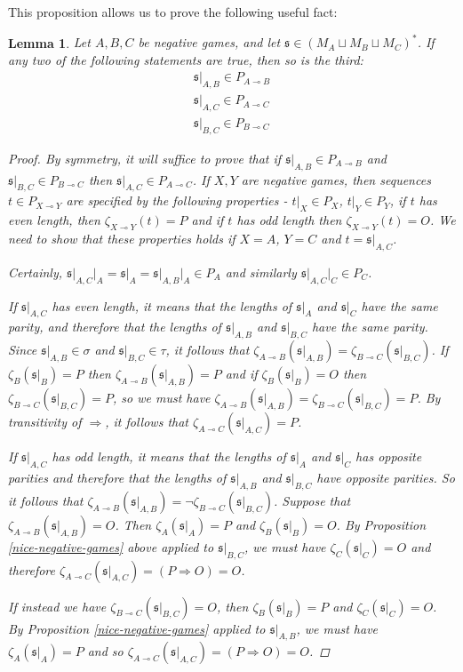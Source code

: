 \documentclass[11pt]{article} %
\theoremstyle{plain} %
\newtheorem{lemma}[theorem]{Lemma}
\theoremstyle{definition} %
\theoremstyle{note}
\theoremstyle{exercisestyle}
\renewcommand{\implies}{\multimap}
\newcommand{\cprd}{\sqcup}
\newcommand{\s}{\mathfrak s}
\begin{document}
This proposition allows us to prove the following useful fact:

\begin{lemma}
  \label{alternatingsequenceslemma}
  Let $A,B,C$ be negative games, and let $\s\in (M_A\cprd M_B\cprd M_C)^*$.  If any two of the following statements are true, then so is the third:
  \begin{gather*}
    \s\vert_{A,B}\in P_{A\implies B}\\
    \s\vert_{A,C}\in P_{A\implies C}\\
    \s\vert_{B,C}\in P_{B\implies C}
  \end{gather*}
  \begin{proof}
    By symmetry, it will suffice to prove that if $\s\vert_{A,B}\in P_{A\implies B}$ and $\s\vert_{B,C}\in P_{B\implies C}$ then $\s\vert_{A,C}\in P_{A\implies C}$.  If $X,Y$ are negative games, then sequences $t\in P_{X\implies Y}$ are specified by the following properties - $t\vert_X\in P_X$, $t\vert_Y\in P_Y$, if $t$ has even length, then $\zeta_{X\implies Y}(t)=P$ and if $t$ has odd length then $\zeta_{X\implies Y}(t)=O$.  We need to show that these properties holds if $X=A$, $Y=C$ and $t=\s\vert_{A,C}$.  

    Certainly, $\s\vert_{A,C}\vert_A=\s\vert_A=\s\vert_{A,B}\vert_A\in P_A$ and similarly $\s\vert_{A,C}\vert_C\in P_C$.  

    If $\s\vert_{A,C}$ has even length, it means that the lengths of $\s\vert_A$ and $\s\vert_C$ have the same parity, and therefore that the lengths of $\s\vert_{A,B}$ and $\s\vert_{B,C}$ have the same parity.  Since $\s\vert_{A,B}\in\sigma$ and $\s\vert_{B,C}\in\tau$, it follows that $\zeta_{A\implies B}(\s\vert_{A,B})=\zeta_{B\implies C}(\s\vert_{B,C})$.  If $\zeta_B(\s\vert_B)=P$ then $\zeta_{A\implies B}(\s\vert_{A,B})=P$ and if $\zeta_B(\s\vert_B)=O$ then $\zeta_{B\implies C}(\s\vert_{B,C})=P$, so we must have $\zeta_{A\implies B}(\s\vert_{A,B})=\zeta_{B\implies C}(\s\vert_{B,C})=P$.  By transitivity of $\Rightarrow$, it follows that $\zeta_{A\implies C}(\s\vert_{A,C})=P$.  

    If $\s\vert_{A,C}$ has odd length, it means that the lengths of $\s\vert_A$ and $\s\vert_C$ has opposite parities and therefore that the lengths of $\s\vert_{A,B}$ and $\s\vert_{B,C}$ have opposite parities.  So it follows that $\zeta_{A\implies B}(\s\vert_{A,B})=\neg\zeta_{B\implies C}(\s\vert_{B,C})$.  Suppose that $\zeta_{A\implies B}(\s\vert_{A,B})=O$.  Then $\zeta_A(\s\vert_A)=P$ and $\zeta_B(\s\vert_B)=O$.  By Proposition \ref{nice-negative-games} above applied to $\s\vert_{B,C}$, we must have $\zeta_C(\s\vert_C)=O$ and therefore $\zeta_{A\implies C}(\s\vert_{A,C})=(P\Rightarrow O)=O$.  

    If instead we have $\zeta_{B\implies C}(\s\vert_{B,C})=O$, then $\zeta_B(\s\vert_B)=P$ and $\zeta_C(\s\vert_C)=O$.  By Proposition \ref{nice-negative-games} applied to $\s\vert_{A,B}$, we must have $\zeta_A(\s\vert_A)=P$ and so $\zeta_{A\implies C}(\s\vert_{A,C})=(P\Rightarrow O) = O$.  
  \end{proof}
\end{lemma}
\end{document}
